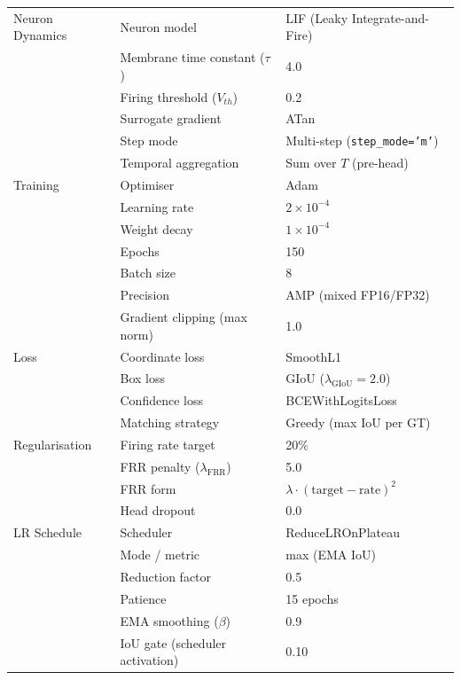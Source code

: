 {\begin{longtable}{|l|l|l|}
\hline
Neuron Dynamics  & Neuron model                         & LIF (Leaky Integrate-and-Fire) \\
                 & Membrane time constant ($\tau$)      & 4.0 \\
                 & Firing threshold ($V_{th}$)          & 0.2 \\
                 & Surrogate gradient                   & ATan \\
                 & Step mode                            & Multi-step (\texttt{step\_mode='m'}) \\
                 & Temporal aggregation                 & Sum over $T$ (pre-head) \\
\hline
Training         & Optimiser                            & Adam \\
                 & Learning rate                        & $2 \times 10^{-4}$ \\
                 & Weight decay                         & $1 \times 10^{-4}$ \\
                 & Epochs                               & 150 \\
                 & Batch size                           & 8 \\
                 & Precision                            & AMP (mixed FP16/FP32) \\
                 & Gradient clipping (max norm)         & 1.0 \\
\hline
Loss             & Coordinate loss                      & SmoothL1 \\
                 & Box loss                             & GIoU ($\lambda_{\text{GIoU}} = 2.0$) \\
                 & Confidence loss                      & BCEWithLogitsLoss \\
                 & Matching strategy                    & Greedy (max IoU per GT) \\
\hline
Regularisation   & Firing rate target                   & 20\% \\
                 & FRR penalty ($\lambda_{\text{FRR}}$) & 5.0 \\
                 & FRR form                             & $\lambda \cdot (\text{target} - \text{rate})^{2}$ \\
                 & Head dropout                         & 0.0 \\
\hline
LR Schedule      & Scheduler                            & ReduceLROnPlateau \\
                 & Mode / metric                        & max (EMA IoU) \\
                 & Reduction factor                     & 0.5 \\
                 & Patience                             & 15 epochs \\
                 & EMA smoothing ($\beta$)              & 0.9 \\
                 & IoU gate (scheduler activation)      & 0.10 \\
\hline
\end{longtable}
}

